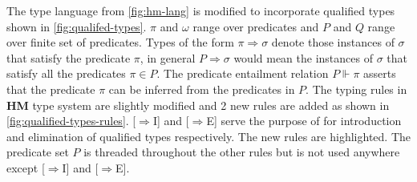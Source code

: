 The type language from \cref{fig:hm-lang} is modified to incorporate
qualified types shown in \cref{fig:qualifed-types}. $\pi$ and $\omega$ range over predicates and  $P$ and $Q$ range over finite set of predicates.
Types of the form $\pi \Rightarrow \sigma$ denote those instances of $\sigma$ that satisfy the predicate $\pi$, in general
$P \Rightarrow \sigma$ would mean the instances of $\sigma$ that satisfy all the predicates $\pi \in P$. The predicate entailment
relation $P \Vdash \pi$ asserts that the predicate $\pi$ can be inferred from the predicates in $P$.
The typing rules in \textbf{HM} type system are slightly modified and 2 new rules are added
as shown in \cref{fig:qualified-types-rules}. [$\Rightarrow$I] and [$\Rightarrow$E] serve the purpose of for introduction and elimination of qualified types respectively.
The new rules are \colorbox{blue!30}{highlighted}. The predicate set $P$ is threaded throughout the other rules
but is not used anywhere except [$\Rightarrow$I] and [$\Rightarrow$E].

